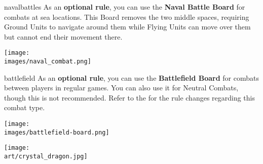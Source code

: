 \newpage
\begin{multicols*}{2}

\begin{expansion}{navalbattles}
  As an \textbf{optional rule}, you can use the \textbf{Naval Battle Board} for combats at sea locations.
  This Board removes the two middle spaces, requiring Ground  Units to navigate around them while Flying  Units can move over them but cannot end their movement there.

  \begin{center}
    \texttt{[image: \\images/naval\_combat.png]}
  \end{center}
\end{expansion}

\vspace{2em}
\begin{expansion}{battlefield}
  As an \textbf{optional rule}, you can use the \textbf{Battlefield Board} for combats between players in regular games.
  You can also use it for Neutral Combats, though this is not recommended.
  Refer to the  for the rule changes regarding this combat type.

  \begin{center}
    \texttt{[image: \\images/battlefield-board.png]}
  \end{center}
\end{expansion}
\vfill

\begin{center}
  \texttt{[image: \\art/crystal\_dragon.jpg]}
\end{center}

\end{multicols*}
